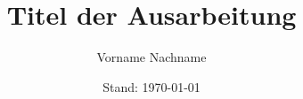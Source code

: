 \newcommand{\N}{\mathbb{N}}
\newcommand{\Z}{\mathbb{Z}}
\newcommand{\Zp}{\Z_{\geq 0}}
\newcommand{\Q}{\mathbb{Q}}
\newcommand{\Qp}{\Q_{\geq 0}}
\newcommand{\R}{\mathbb{R}}
\newcommand{\Rp}{\R_{\geq 0}}
\newcommand{\Rmn}{\R^{m\times n}}

\newcommand{\eps}{\varepsilon}

\author{Vorname Nachname}
\title{Titel der Ausarbeitung}
\subject{Schriftliche Ausarbeitung}
\def \vorlesung {Seminar: Name der Veranstaltung}
\def \semester {Semester Jahr}
\def \dozent {Prof. Dr. Name}
\date{Stand: \today}
